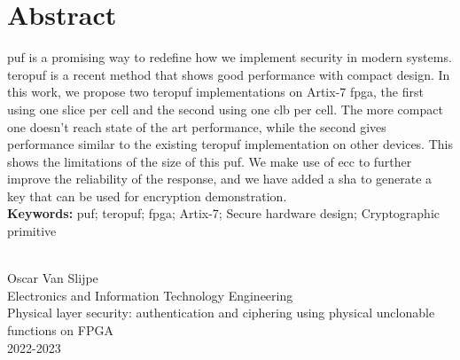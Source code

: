 \chapter*{Abstract}

\acrfull{puf} is a promising way to redefine how we implement security in modern systems. \acrfull{teropuf} is a recent method that shows good performance with compact design. In this work, we propose two \acrshort{teropuf} implementations on Artix-7 \acrfull{fpga}, the first using one slice per cell and the second using one \acrfull{clb} per cell. The more compact one doesn't reach state of the art performance, while the second gives performance similar to the existing \acrshort{teropuf} implementation on other devices. This shows the limitations of the size of this \acrshort{puf}. We make use of \acrfull{ecc} to further improve the reliability of the response, and we have added a \acrfull{sha} to generate a key that can be used for encryption demonstration.\\

\textbf{Keywords:} \acrlong{puf}; \acrlong{teropuf}; \acrlong{fpga}; Artix-7; Secure hardware design; Cryptographic primitive

\vspace*{\fill}\\
\noindent Oscar Van Slijpe\\
Electronics and Information Technology Engineering\\
Physical layer security: authentication and ciphering using physical unclonable functions on FPGA\\
2022-2023